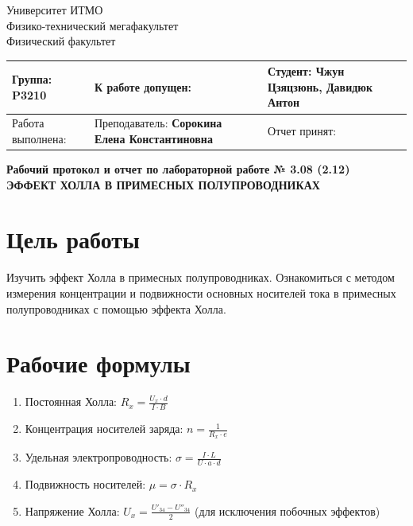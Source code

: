 \documentclass[a4paper,12pt]{article}
\begin{document}
\begin{flushleft}
    Университет ИТМО \\
    Физико-технический мегафакультет \\
    Физический факультет \\
\end{flushleft}

\vspace{0.5cm}

\noindent
\begin{tabularx}{\textwidth}{|X|X|X|}
\hline
Группа: \textbf{P3210} & К работе допущен: & Студент: \textbf{Чжун Цзяцзюнь, Давидюк Антон} \\ \hline
Работа выполнена: & Преподаватель: \textbf{Сорокина Елена Константиновна} & Отчет принят: \\ \hline
\end{tabularx}

\vspace{1cm}

\begin{center}
    \Large \textbf{Рабочий протокол и отчет по лабораторной работе № 3.08 (2.12)} \\
    \large \textbf{ЭФФЕКТ ХОЛЛА В ПРИМЕСНЫХ ПОЛУПРОВОДНИКАХ}
\end{center}

\section{Цель работы}
Изучить эффект Холла в примесных полупроводниках. Ознакомиться с методом измерения концентрации и подвижности основных носителей тока в примесных полупроводниках с помощью эффекта Холла.

\section{Рабочие формулы}
\begin{enumerate}
    \item Постоянная Холла: $R_x = \frac{U_x \cdot d}{I \cdot B}$
    \item Концентрация носителей заряда: $n = \frac{1}{R_x \cdot e}$
    \item Удельная электропроводность: $\sigma = \frac{I \cdot L}{U \cdot a \cdot d}$
    \item Подвижность носителей: $\mu = \sigma \cdot R_x$
    \item Напряжение Холла: $U_x = \frac{U'_{34} - U''_{34}}{2}$ (для исключения побочных эффектов)
\end{enumerate}
\end{document}
